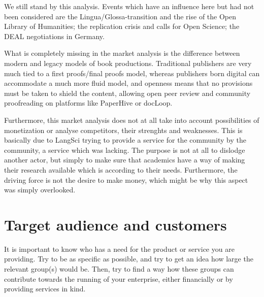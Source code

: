 \documentclass[nonflat,smallfont
]{langsci/langscibook}
\newcommand{\background}[1]{ 
  \vspace{5mm}
  \renewcommand{\tblslinecolour}{lsDarkBlue}
  \tblssy[red]{explore2}{Background}{\vspace*{-5mm}#1}
}
\newcommand{\evaluation}[1]{
  \renewcommand{\tblslinecolour}{lsLightOrange}
  \tblssy{receipt}{Evaluation}{\vspace*{-5mm}#1}
}
\newcommand{\othersolutions}[1]{
  \renewcommand{\tblslinecolour}{lsDarkGreenOne}
  \tblssy{more}{Other solutions}{\vspace*{-5mm}#1}
}
\renewcommand{\tblssy}[4][black!12]{%
  \renewcommand{\langscisymbol}{#2}\renewcommand{\tblsboxcolor}{#1}
  \begin{mdframed}[style=yellowexercise,frametitle={#3}]
    #4
  \end{mdframed}
}
\begin{document}
\evaluation{
We still stand by this analysis. Events which have an influence here but had not been considered are the Lingua/Glossa-transition and the rise of the Open Library of Humanities; the replication crisis and calls for Open Science; the DEAL negotiations in Germany.  
}
\othersolutions{
What is completely missing in the market analysis is the difference between modern and legacy models of book productions. Traditional publishers are very much tied to a first proofs/final proofs model, whereas publishers born digital can accommodate a much more fluid model, and openness means that no provisions must be taken to shield the content, allowing open peer review and community proofreading on platforms like PaperHive or docLoop.

Furthermore, this market analysis does not at all take into account possibilities of monetization or analyse competitors, their strenghts and weaknesses.%
This is basically due to LangSci trying to provide a service for the community by the community, a service which was lacking. The purpose is not at all to dislodge another actor, but simply to make sure that academics have a way of making their research available which is according to their needs. Furthermore, the driving force is not the desire to make money, which might be why this aspect was simply overlooked.
}
 
\section{Target audience and customers}

\background{It is important to know who has a need for the product or service you are providing. Try to be as specific as possible, and try to get an idea how large the relevant group(s) would be. Then, try to find a way how these groups can contribute towards the running of your enterprise, either financially or by providing services in kind.
}
\end{document}

